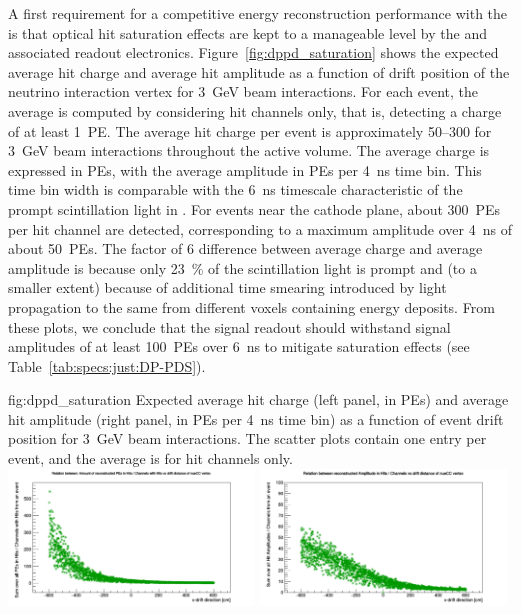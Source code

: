 A first requirement for a competitive energy reconstruction performance with the  is that optical hit saturation effects are kept to a manageable level by the  and associated readout electronics. Figure~\ref{fig:dppd_saturation} shows the expected average hit charge and average hit amplitude as a function of drift position of the neutrino interaction vertex for \SI{3}{\GeV} beam \nue {} interactions. For each event, the average is computed by considering hit  channels only, that is,  detecting a charge of at least \SI{1}{PE}. The average hit charge per event is approximately \SIrange{50}{300}{} for \SI{3}{\GeV} beam \nue {} interactions throughout the  active volume. The average charge is expressed in PEs, with the average amplitude in PEs per \SI{4}{\nano\s} time bin. This time bin width is comparable with the \SI{6}{\nano\s} timescale characteristic of the prompt scintillation light in . For events near the cathode plane, about \SI{300}{PEs} per hit channel are detected, corresponding to a maximum amplitude over \SI{4}{\nano\s} of about \SI{50}{PEs}. The factor of 6 difference between average charge and average amplitude is because only \SI{23}{\%} of the scintillation light is prompt and (to a smaller extent) because of additional time smearing introduced by light propagation to the same  from different  voxels containing energy deposits. From these plots, we conclude that the  signal readout should withstand signal amplitudes of at least \SI{100}{PEs} over \SI{6}{\nano\s} to mitigate saturation effects (see Table~\ref{tab:specs:just:DP-PDS}).

\begin{dunefigure}{fig:dppd_saturation}
{Expected average hit charge (left panel, in PEs) and average hit amplitude (right panel, in PEs per \SI{4}{\nano\s} time bin) as a function of event drift position for \SI{3}{\GeV} beam \nue {} interactions. The scatter plots  contain one entry per event, and the average is for hit  channels only.}
\includegraphics[trim={0cm 0cm 0cm 1.cm}, clip, width=0.49\textwidth]{graphics/dppd_avg_charge_per_channel.pdf} \hfill
\includegraphics[trim={0cm 0cm 0cm 1.cm}, clip, width=0.49\textwidth]{graphics/dppd_avg_amplitude_per_channel.pdf}
\end{dunefigure}


